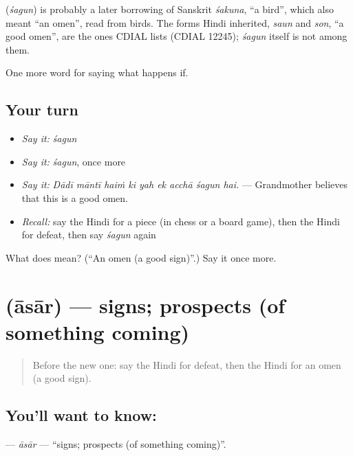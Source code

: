 \begin{cousinweb}
\textbf{} (\emph{śagun}) is probably a later borrowing of Sanskrit \emph{śakuna}, \textquotedblleft{}a bird\textquotedblright{}, which also meant \textquotedblleft{}an omen\textquotedblright{}, read from birds. The forms Hindi inherited, \emph{saun} and \emph{son}, \textquotedblleft{}a good omen\textquotedblright{}, are the ones CDIAL lists (CDIAL 12245); \emph{śagun} itself is not among them.
\end{cousinweb}

\begin{grammarlens}[title={What you've built}]
One more word for saying what happens if.
\end{grammarlens}

\subsection*{Your turn}
\begin{itemize}
\raggedright
  \item \emph{Say it:} \emph{śagun}
  \item \emph{Say it:} \emph{śagun}, once more
  \item \emph{Say it:} \emph{Dādī māntī haiṁ ki yah ek acchā śagun hai.} — Grandmother believes that this is a good omen.
  \item \emph{Recall:} say the Hindi for a piece (in chess or a board game), then the Hindi for defeat, then say \emph{śagun} again
\end{itemize}

\begin{tcolorbox}[breakable,colback=teal!4,colframe=teal!35!black,title={Before you move on}]
What does  mean? (\textquotedblleft{}An omen (a good sign)\textquotedblright{}.) Say it once more.
\end{tcolorbox}
\section[\texorpdfstring{\hi{आसार} (āsār)}{आसार (āsār)}]{ (āsār) — signs; prospects (of something coming)}

\label{lesson:HI-C546-asar}



\begin{quote}
Before the new one: say the Hindi for defeat, then the Hindi for an omen (a good sign).
\end{quote}

\subsection*{You'll want to know: }
\textbf{} — \emph{āsār} — \textquotedblleft{}signs; prospects (of something coming)\textquotedblright{}.

